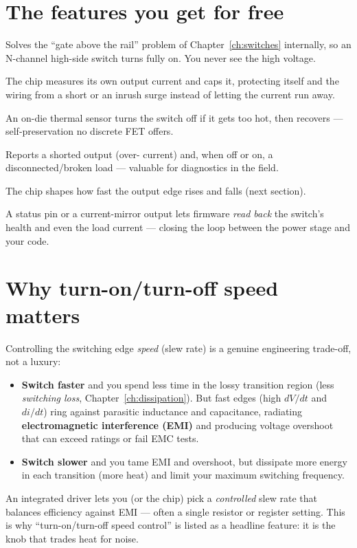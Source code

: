 \documentclass[11pt,a4paper,oneside]{book}
\begin{document}
\section{The features you get for free}
\begin{description}[leftmargin=0.4cm,style=nextline]
  \item[Charge pump + gate driver.] Solves the ``gate above the rail'' problem
        of Chapter~\ref{ch:switches} internally, so an N-channel high-side switch
        turns fully on. You never see the high voltage.
  \item[Current limiting.] The chip measures its own output current and caps it,
        protecting itself and the wiring from a short or an inrush surge instead
        of letting the current run away.
  \item[Over-temperature shutdown.] An on-die thermal sensor turns the switch off
        if it gets too hot, then recovers --- self-preservation no discrete FET
        offers.
  \item[Short-circuit \& open-load detection.] Reports a shorted output (over-
        current) and, when off or on, a disconnected/broken load --- valuable for
        diagnostics in the field.
  \item[Slew-rate (turn-on/turn-off speed) control.] The chip shapes how fast the
        output edge rises and falls (next section).
  \item[Diagnostic feedback / current sense.] A status pin or a current-mirror
        output lets firmware \emph{read back} the switch's health and even the
        load current --- closing the loop between the power stage and your code.
\end{description}

\section{Why turn-on/turn-off speed matters}
Controlling the switching edge \emph{speed} (slew rate) is a genuine engineering
trade-off, not a luxury:
\begin{itemize}[leftmargin=1.4cm]
  \item \textbf{Switch faster} and you spend less time in the lossy transition
        region (less \emph{switching loss}, Chapter~\ref{ch:dissipation}). But
        fast edges (high $dV/dt$ and $di/dt$) ring against parasitic inductance
        and capacitance, radiating \textbf{electromagnetic interference (EMI)}
        and producing voltage overshoot that can exceed ratings or fail EMC
        tests.
  \item \textbf{Switch slower} and you tame EMI and overshoot, but dissipate more
        energy in each transition (more heat) and limit your maximum switching
        frequency.
\end{itemize}
An integrated driver lets you (or the chip) pick a \emph{controlled} slew rate
that balances efficiency against EMI --- often a single resistor or register
setting. This is why ``turn-on/turn-off speed control'' is listed as a headline
feature: it is the knob that trades heat for noise.
\end{document}
